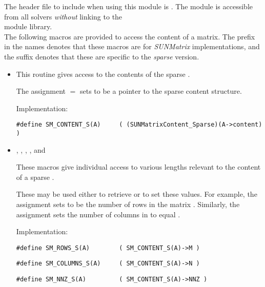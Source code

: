 \noindent The header file to include when using this module 
is . The {\sunmatsparse} module
is accessible from all {\sundials} solvers \textit{without}
linking to the \\
 module library. \\

\noindent The following macros are provided to access the
content of a {\sunmatsparse} matrix. The prefix  in the names
denotes that these macros are for \emph{SUNMatrix} implementations,
and the suffix  denotes that these are specific to
the \emph{sparse} version.
\begin{itemize}

\item {}
    
  This routine gives access to the contents of the
  sparse .
  
  The assignment  $=$  sets           
   to be a pointer to the sparse  content  
  structure.                                             
                                                            
  Implementation: 
  
  \verb|#define SM_CONTENT_S(A)     ( (SUNMatrixContent_Sparse)(A->content) )|
  
\item {}, , , , and 

  These macros give individual access to various lengths relevant to the
  content of a sparse .
                                                               
  These may be used either to retrieve or to set these values.  For
  example, the assignment  sets  to be
  the number of rows in the matrix .  Similarly, the
  assignment  sets the number of
  columns in  to equal .
  
  Implementation: 
  
  \verb|#define SM_ROWS_S(A)        ( SM_CONTENT_S(A)->M )|

  \verb|#define SM_COLUMNS_S(A)     ( SM_CONTENT_S(A)->N )|

  \verb|#define SM_NNZ_S(A)         ( SM_CONTENT_S(A)->NNZ )|


\end{itemize}
